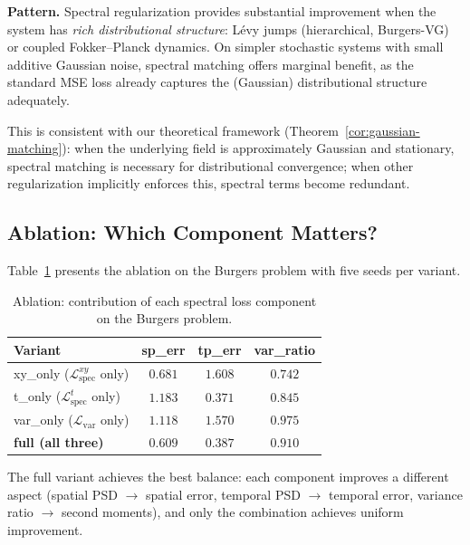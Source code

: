 \documentclass[times,12pt]{elsarticle}
\begin{document}
\textbf{Pattern.} Spectral regularization provides substantial improvement when the system has \emph{rich distributional structure}: L\'evy jumps (hierarchical, Burgers-VG) or coupled Fokker--Planck dynamics. On simpler stochastic systems with small additive Gaussian noise, spectral matching offers marginal benefit, as the standard MSE loss already captures the (Gaussian) distributional structure adequately.

This is consistent with our theoretical framework (Theorem~\ref{cor:gaussian-matching}): when the underlying field is approximately Gaussian and stationary, spectral matching is necessary for distributional convergence; when other regularization implicitly enforces this, spectral terms become redundant.

\subsection{Ablation: Which Component Matters?}
\label{sec:ablation}


Table~\ref{tab:ablation} presents the ablation on the Burgers problem with five seeds per variant.

\begin{table}[h]
\centering
\caption{Ablation: contribution of each spectral loss component on the Burgers problem.}
\label{tab:ablation}
\begin{tabular}{lccc}
\toprule
Variant & sp\_err & tp\_err & var\_ratio \\
\midrule
xy\_only ($\mathcal{L}_{\text{spec}}^{xy}$ only) & $0.681$ & $1.608$ & $0.742$ \\
t\_only ($\mathcal{L}_{\text{spec}}^{t}$ only)   & $1.183$ & $0.371$ & $0.845$ \\
var\_only ($\mathcal{L}_{\text{var}}$ only)      & $1.118$ & $1.570$ & $0.975$ \\
\textbf{full (all three)} & $\mathbf{0.609}$ & $\mathbf{0.387}$ & $0.910$ \\
\bottomrule
\end{tabular}
\end{table}

The full variant achieves the best balance: each component improves a different aspect (spatial PSD $\to$ spatial error, temporal PSD $\to$ temporal error, variance ratio $\to$ second moments), and only the combination achieves uniform improvement.
\end{document}
